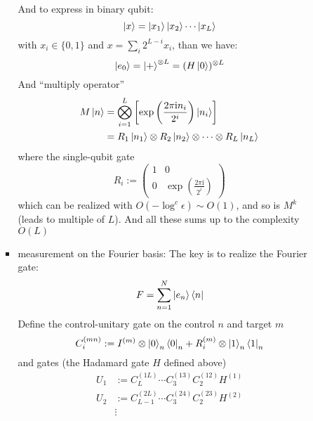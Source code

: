 \documentclass[11pt,a4paper]{article}%
\numberwithin{equation}{section}
\newcommand\mi{\mathrm{i}}
\begin{document}
\begin{enumerate}
\begin{itemize}
\begin{itemize}
\begin{equation}
            \end{equation}
            And to express in binary qubit:
            \begin{equation}
                \ket x = \ket{x_1}\ket{x_2}\cdots\ket{x_L}
            \end{equation}
            with $x_i\in\{0,1\}$ and $x = \sum_i 2^{L-i}x_i$, than we have:
            \begin{equation}
                \ket{e_0} = \ket+^{\otimes L} = (H\ket 0)^{\otimes L}
            \end{equation}
            And ``multiply operator''
            \begin{align}
                M\ket n &= \bigotimes_{i=1}^L\left[\exp\left(\frac{2\pi \mi n_i}{2^i}\right)\ket{n_i}\right] \\
                &= R_1\ket{n_1}\otimes R_2\ket{n_2}\otimes\cdots\otimes R_L\ket{n_L}
            \end{align}
            where the single-qubit gate
            \begin{equation}
                R_i := \begin{pmatrix}
                    1 & 0\\
                    0 & \exp\left(\frac{2\pi \mi}{2^i}\right)
                \end{pmatrix}
            \end{equation}
            which can be realized with $O(-\log^c\epsilon)\sim O(1)$, and so is $M^k$ (leads to multiple of $L$). And all these sums up to the complexity $O(L)$
            \item measurement on the Fourier basis: The key is to realize the Fourier gate:
            \begin{equation}
                F = \sum_{n=1}^N\ket{e_n}\bra n
            \end{equation}
            Define the control-unitary gate on the control $n$ and target $m$
            \begin{equation}
                C_i^{(mn)} := I^{(m)}\otimes\ket0_n\bra0_n + R^{(m)}_i\otimes\ket1_n\bra1_n
            \end{equation}
            and gates (the Hadamard gate $H$ defined above)
            \begin{align}
                U_1 &:= C_L^{(1L)}\cdots C_3^{(13)}C_2^{(12)}H^{(1)} \\
                U_2 &:= C_{L-1}^{(2L)}\cdots C_3^{(24)}C_2^{(23)}H^{(2)} \\
                &\vdots \\

\end{align}
\end{itemize}
\end{itemize}
\end{enumerate}
\end{document}
